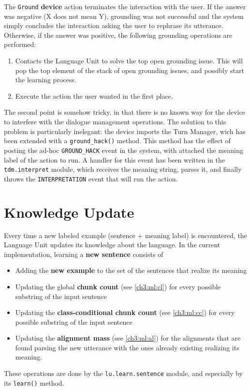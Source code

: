 The \texttt{Ground} \textbf{device} action terminates the interaction with the user. If the answer was negative (X does not mean Y), grounding was not successful and the system simply concludes the interaction asking the user to rephrase its utterance. Otherwise, if the answer was positive, the following grounding operations are performed:
\begin{enumerate}
	\item Contacts the Language Unit to solve the top open grounding issue. This will pop the top element of the stack of open grounding issues, and possibly start the learning process.
	\item Execute the action the user wanted in the first place.
\end{enumerate}

The second point is somehow tricky, in that there is no known way for the device to interfere with the dialogue management operations. The solution to this problem is particularly inelegant: the device imports the Turn Manager, wich has been extended with a \texttt{ground\_hack()} method. This method has the effect of posting the ad-hoc \texttt{GROUND\_HACK} event in the system, with attached the meaning label of the action to run. A handler for this event has been written in the \texttt{tdm.interpret} module, which receives the meaning string, parses it, and finally throws the \texttt{INTERPRETATION} event that will run the action.


\section{Knowledge Update} \label{ch:interaction:learn}

Every time a new labeled example (sentence + meaning label) is encountered, the Language Unit updates its knowledge about the language. In the current implementation, learning a \textbf{new sentence} consists of
\begin{itemize}
	\item Adding the \textbf{new example} to the set of the sentences that realize its meaning
	\item Updating the global \textbf{chunk count} (see \ref{ch3:ml:cl}) for every possible substring of the input sentence
	\item Updating the \textbf{class-conditional chunk count} (see \ref{ch3:ml:cc}) for every possible substring of the input sentence
	\item Updating the \textbf{alignment mass} (see \ref{ch3:ml:al}) for the alignments that are found parsing the new utterance with the ones already existing realizing its meaning.
\end{itemize}
These operations are done by the \texttt{lu.learn.sentence} module, and especially by its \texttt{learn()} method.

